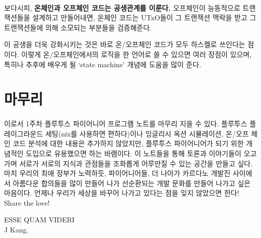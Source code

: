 \documentclass[a4paper, 11pt]{article}
\begin{document}
    \paragraph{} 보다시피, \textbf{온체인과 오프체인 코드는 공생관계를 이룬다.} 오프체인이 능동적으로 트랜잭션들을 설계하고 만들어내면, 온체인 코드는 UTxO들이 그 트랜잭션 맥락을 받고 그 트랜잭션들에 의해 소모되는 부분들을 검증해준다.

    이 공생을 더욱 강화시키는 것은 바로 온/오프체인 코드가 모두 하스켈로 쓰인다는 점이다. 이렇게 온/오프체인에서의 로직을 한 언어로 쓸 수 있으면 여러 장점이 있으며, 특히나 추후에 배우게 될 `state machine' 개념에 도움을 많이 준다.
    
    \section{마무리}

    \paragraph{} 이로서 1주차 플루투스 파이어니어 프로그램 노트를 마무리 지을 수 있다. 플루투스 플레이그라운드 세팅(nix를 사용하면 편하다)이나 잉글리시 옥션 시뮬레이션, 온/오프 체인 코드 분석에 대한 내용은 추가하지 않았지만, 플루투스 파이어니어가 되기 위한 개념적인 도입으로 유용했으면 하는 바램이다. 이 노트들을 통해 토론과 이야기들이 오고가며 서로가 서로의 지식과 관점들을 조화롭게 어루만질 수 있는 공간을 만들고 싶다. 마치 우리의 최애 장부가 노력하듯, 파이어니어들, 더 나아가 카르다노 개발진 사이에서 아름다운 합의들을 많이 만들어 나가 선순환되는 개발 문화를 만들어 나가고 싶은 마음이다. 언제나 우리가 세상을 바꾸어 나가고 있다는 점을 잊지 않았으면 한다! Share the love! \heartsuit 
    
    
    ESSE QUAM VIDERI\\
    J Kang.
\end{document}
